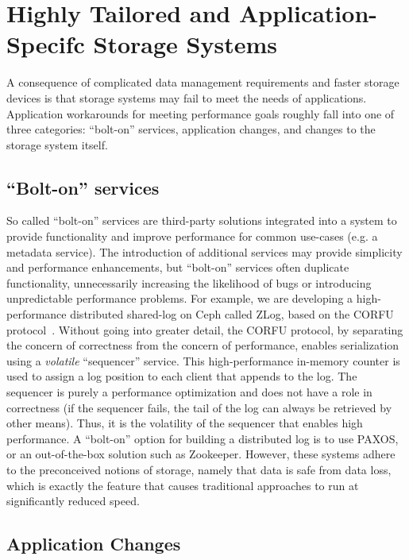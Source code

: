 \documentclass[10pt,twocolumn]{article}
\begin{document}
\section{Highly Tailored and Application-Specifc Storage
Systems}\label{highly-tailored-and-application-specifc-storage-systems}

\label{problem}

A consequence of complicated data management requirements and faster storage
devices is that storage systems may fail to meet the needs of applications.
Application workarounds for meeting performance goals roughly fall into one of
three categories: ``bolt-on'' services, application changes, and changes to
the storage system itself.

\subsection{\texorpdfstring{``Bolt-on''
services}{Bolt-on services}}\label{bolt-on-services}

So called ``bolt-on'' services are third-party solutions integrated into a
system to provide functionality and improve performance for common use-cases
(e.g. a metadata service). The introduction of additional services may provide
simplicity and performance enhancements, but ``bolt-on'' services often
duplicate functionality, unnecessarily increasing the likelihood of bugs or
introducing unpredictable performance problems. For example, we are developing
a high-performance distributed shared-log on Ceph called ZLog, based on the
CORFU protocol~\cite{balakrishnan_corfu_2012}. Without going into greater detail, the CORFU protocol, by separating the concern of correctness from the concern of performance, enables serialization using a \emph{volatile}
``sequencer'' service. This high-performance in-memory counter is used to assign a log
position to each client that appends to the log. The sequencer is purely a performance optimization and does not have a role in correctness (if the sequencer fails, the tail of the log can always be retrieved by other means). Thus, it is the volatility of the sequencer that enables high performance. A ``bolt-on'' option for building
a distributed log is to use PAXOS, or an out-of-the-box solution such as
Zookeeper. However, these systems adhere to the preconceived notions of
storage, namely that data is safe from data loss, which is exactly the feature
that causes traditional approaches to run at significantly reduced speed. 

\subsection{Application Changes}\label{application-changes}
\end{document}
